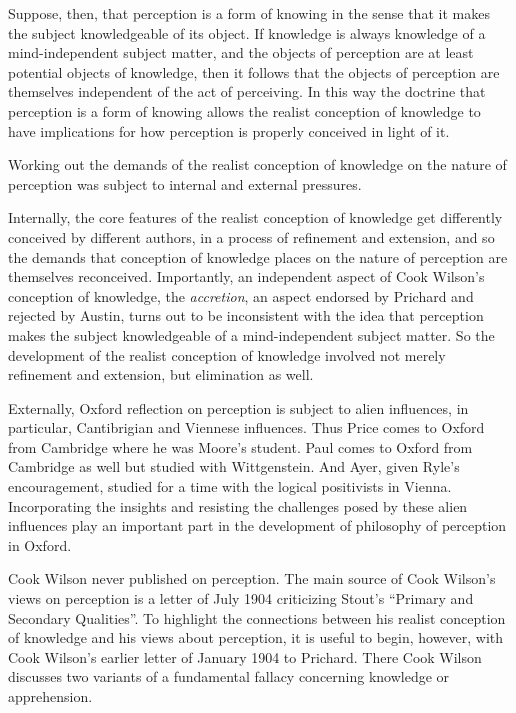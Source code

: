 Suppose, then, that perception is a form of knowing in the sense that it makes the subject knowledgeable of its object. If knowledge is always knowledge of a mind-independent subject matter, and the objects of perception are at least potential objects of knowledge, then it follows that the objects of perception are themselves independent of the act of perceiving. In this way the doctrine that perception is a form of knowing allows the realist conception of knowledge to have implications for how perception is properly conceived in light of it.

Working out the demands of the realist conception of knowledge on the nature of perception was subject to internal and external pressures. 

Internally, the core features of the realist conception of knowledge get differently conceived by different authors, in a process of refinement and extension, and so the demands that conception of knowledge places on the nature of perception are themselves reconceived. Importantly, an independent aspect of Cook Wilson's conception of knowledge, the \emph{accretion}, an aspect endorsed by Prichard and rejected by Austin, turns out to be inconsistent with the idea that perception makes the subject knowledgeable of a mind-independent subject matter. So the development of the realist conception of knowledge involved not merely refinement and extension, but elimination as well.

Externally, Oxford reflection on perception is subject to alien influences, in particular, Cantibrigian and Viennese influences. Thus Price comes to Oxford from Cambridge where he was Moore's student. Paul comes to Oxford from Cambridge as well but studied with Wittgenstein. And Ayer, given Ryle's encouragement, studied for a time with the logical positivists in Vienna. Incorporating the insights and resisting the challenges posed by these alien influences play an important part in the development of philosophy of perception in Oxford.

Cook Wilson never published on perception. The main source of Cook Wilson's \citeyear{Cook-Wilson:1926sf} views on perception is a letter of July 1904 criticizing Stout's \citeyear{Stout:1903zl} ``Primary and Secondary Qualities''. To highlight the connections between his realist conception of knowledge and his views about perception, it is useful to begin, however, with Cook Wilson's \citeyear{Cook-Wilson:1926sf} earlier letter of January 1904 to Prichard. There Cook Wilson discusses two variants of a fundamental fallacy concerning knowledge or apprehension.

